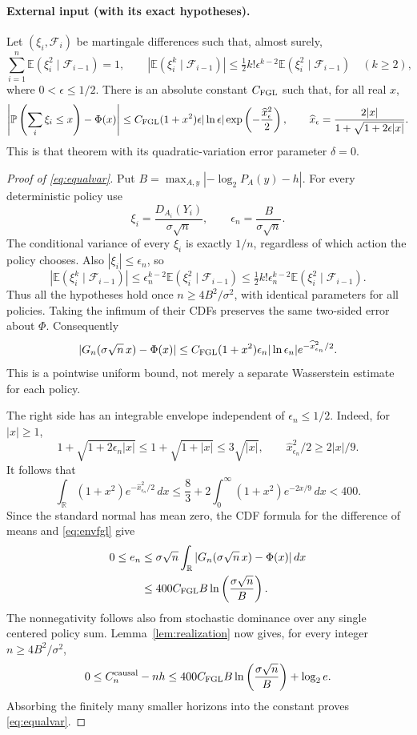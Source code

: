 \documentclass[11pt,a4paper]{article}
\newcommand{\E}{\mathbb E}
\newcommand{\Prob}{\mathbb P}
\newcommand{\causal}{\mathrm{causal}}
\newcommand{\R}{\mathbb R}
\begin{document}
\paragraph{External input (with its exact hypotheses).}
Let $(\xi_i,\mathcal F_i)$ be martingale differences such that, almost
surely,
\[
\sum_{i=1}^n\E(\xi_i^2\mid\mathcal F_{i-1})=1,\qquad
\left|\E(\xi_i^k\mid\mathcal F_{i-1})\right|
\le\tfrac12 k!\epsilon^{k-2}\E(\xi_i^2\mid\mathcal F_{i-1})
\quad(k\ge2),
\]
where $0<\epsilon\le1/2$. There is an absolute constant $C_{\rm FGL}$
such that, for all real $x$,
\begin{equation}\label{eq:fgl}
\left|\Prob\left(\sum_i\xi_i\le x\right)-\Phi(x)\right|
\le C_{\rm FGL}(1+x^2)\epsilon|\ln\epsilon|
\exp\left(-\frac{\widehat x_\epsilon^2}{2}\right),\qquad
\widehat x_\epsilon=\frac{2|x|}{1+\sqrt{1+2\epsilon|x|}}.
\end{equation}
This is that theorem with its quadratic-variation error parameter
$\delta=0$.

\begin{proof}[Proof of \eqref{eq:equalvar}]
Put $B=\max_{A,y}|-\log_2P_A(y)-h|$. For every deterministic policy use
\[
\xi_i=\frac{D_{A_i}(Y_i)}{\sigma\sqrt n},\qquad
\epsilon_n=\frac{B}{\sigma\sqrt n}.
\]
The conditional variance of every $\xi_i$ is exactly $1/n$, regardless
of which action the policy chooses. Also $|\xi_i|\le\epsilon_n$, so
\[
\left|\E(\xi_i^k\mid\mathcal F_{i-1})\right|
\le\epsilon_n^{k-2}\E(\xi_i^2\mid\mathcal F_{i-1})
\le\tfrac12 k!\epsilon_n^{k-2}\E(\xi_i^2\mid\mathcal F_{i-1}).
\]
Thus all the hypotheses hold once $n\ge4B^2/\sigma^2$, with identical
parameters for all policies. Taking the infimum of their CDFs preserves
the same two-sided error about $\Phi$. Consequently
\begin{equation}\label{eq:envfgl}
|G_n(\sigma\sqrt n\,x)-\Phi(x)|
\le C_{\rm FGL}(1+x^2)\epsilon_n|\ln\epsilon_n|
e^{-\widehat x_{\epsilon_n}^2/2}.
\end{equation}
This is a pointwise uniform bound, not merely a separate Wasserstein
estimate for each policy.

The right side has an integrable envelope independent of
$\epsilon_n\le1/2$. Indeed, for $|x|\ge1$,
\[
1+\sqrt{1+2\epsilon_n|x|}
\le1+\sqrt{1+|x|}\le3\sqrt{|x|},\qquad
\widehat x_{\epsilon_n}^2/2\ge2|x|/9.
\]
It follows that
\[
\int_{\R}(1+x^2)e^{-\widehat x_{\epsilon_n}^2/2}\,dx
\le\frac83+2\int_0^\infty(1+x^2)e^{-2x/9}\,dx<400.
\]
Since the standard normal has mean zero, the CDF formula for the
difference of means and \eqref{eq:envfgl} give
\begin{align*}
0\le e_n
&\le\sigma\sqrt n\int_{\R}|G_n(\sigma\sqrt n\,x)-\Phi(x)|\,dx\\
&\le400C_{\rm FGL}B\ln\left(\frac{\sigma\sqrt n}{B}\right).
\end{align*}
The nonnegativity follows also from stochastic dominance over any
single centered policy sum. Lemma~\ref{lem:realization} now gives,
for every integer $n\ge4B^2/\sigma^2$,
\[
0\le C_n^{\causal}-nh
\le400C_{\rm FGL}B\ln\left(\frac{\sigma\sqrt n}{B}\right)+\log_2e.
\]
Absorbing the finitely many smaller horizons into the constant proves
\eqref{eq:equalvar}.
\end{proof}
\end{document}
